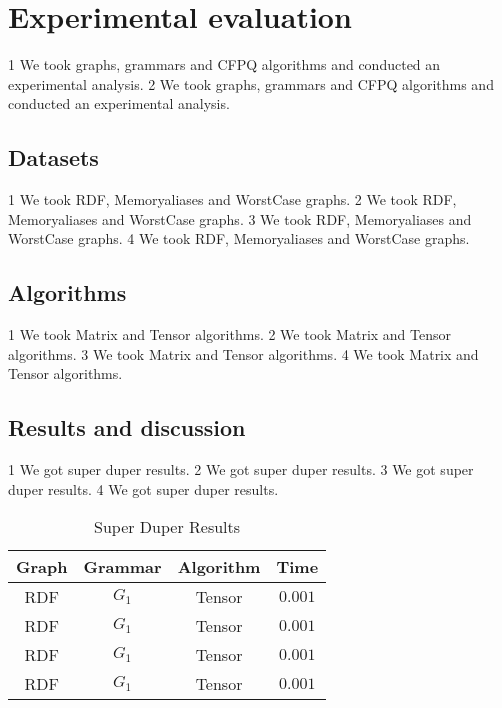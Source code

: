 \section{Experimental evaluation}
1 We took graphs, grammars and CFPQ algorithms and conducted an experimental analysis.
2 We took graphs, grammars and CFPQ algorithms and conducted an experimental analysis.

\subsection{Datasets}
1 We took RDF, Memoryaliases and WorstCase graphs.
2 We took RDF, Memoryaliases and WorstCase graphs.
3 We took RDF, Memoryaliases and WorstCase graphs.
4 We took RDF, Memoryaliases and WorstCase graphs.

\subsection{Algorithms}
1 We took Matrix and Tensor algorithms.
2 We took Matrix and Tensor algorithms.
3 We took Matrix and Tensor algorithms.
4 We took Matrix and Tensor algorithms.

\subsection{Results and discussion}
1 We got super duper results.
2 We got super duper results.
3 We got super duper results.
4 We got super duper results.

\begin{table}
  \caption{Super Duper Results}
  \label{tab:results}
  \begin{tabular}{cccc}
    \toprule
    Graph & Grammar & Algorithm & Time\\
    \midrule
    RDF&$G_1$&Tensor&$0.001$\\
    RDF&$G_1$&Tensor&$0.001$\\
    RDF&$G_1$&Tensor&$0.001$\\
    RDF&$G_1$&Tensor&$0.001$\\
  \bottomrule
\end{tabular}
\end{table}
